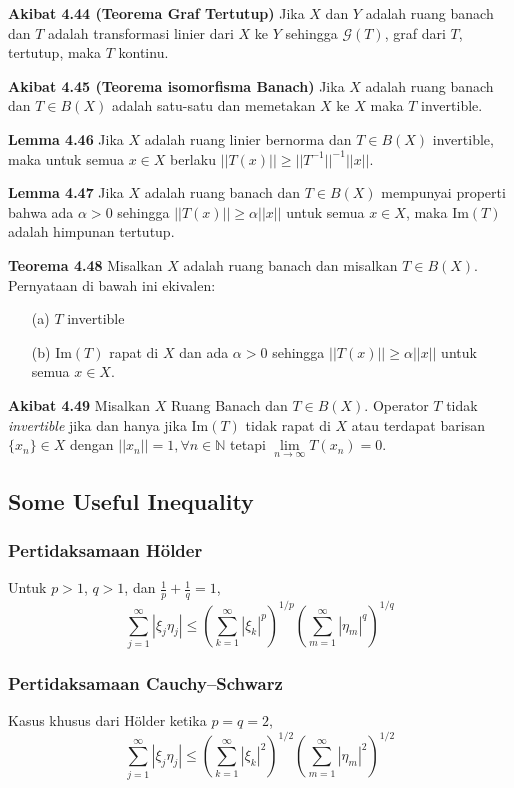 \documentclass{article}
\newcommand{\N}{\mathbb{N}}
\begin{document}
\begin{multicols}{2}
  \textbf{Akibat 4.44 (Teorema Graf Tertutup)}  Jika $X$ dan $Y$ adalah ruang banach dan $T$ adalah transformasi linier dari $X$  ke $Y$ sehingga $\mathcal{G}(T)$, graf dari $T$, tertutup, maka $T$ kontinu.

  \textbf{Akibat 4.45 (Teorema isomorfisma Banach)} Jika $X$ adalah ruang banach dan $T \in B(X)$ adalah satu-satu dan memetakan $X$ ke $X$ maka $T$ invertible.

  \textbf{Lemma 4.46} Jika $X$ adalah ruang linier bernorma dan $T \in B(X)$ invertible, maka untuk semua $x \in X$ berlaku $||T(x)|| \geq ||T^{-1}||^{-1}||x||.$

  \textbf{Lemma 4.47} Jika $X$ adalah ruang banach dan $T \in B(X)$ mempunyai properti bahwa ada $\alpha>0$ sehingga $||T(x)|| \geq \alpha||x||$ untuk semua $x \in X$, maka Im$(T)$ adalah himpunan tertutup.

  \textbf{Teorema 4.48} Misalkan $X$ adalah ruang banach dan misalkan $T \in {B}(X)$. Pernyataan di bawah ini ekivalen:
  \begin{itemize}
    \item [(a)] $T$ invertible
    \item [(b)] Im$(T)$ rapat di $X$ dan ada $\alpha >0$ sehingga $||T(x)|| \geq \alpha||x||$ untuk semua $x \in X$.
  \end{itemize}

  \textbf{Akibat 4.49} Misalkan $X$ Ruang Banach dan $T\in B(X)$. Operator $T$ tidak \textit{invertible} jika dan hanya jika Im$(T)$ tidak rapat di $X$ atau terdapat barisan $\{x_n\}\in X$ dengan $||x_n||=1,\forall n\in \N$ tetapi $\lim\limits_{n\to\infty}T(x_n)=0$.

  \subsection*{Some Useful Inequality}
  \subsubsection*{Pertidaksamaan Hölder}
  Untuk \( p > 1 \), \( q > 1 \), dan \( \frac{1}{p} + \frac{1}{q} = 1 \),
  \[
    \sum_{j=1}^{\infty} |\xi_j \eta_j| \le \left( \sum_{k=1}^{\infty} |\xi_k|^p \right)^{1/p} \left( \sum_{m=1}^{\infty} |\eta_m|^q \right)^{1/q}
  \]
  \subsubsection*{Pertidaksamaan Cauchy–Schwarz}
  Kasus khusus dari Hölder ketika \( p = q = 2 \),
  \[
    \sum_{j=1}^{\infty} |\xi_j \eta_j| \le \left( \sum_{k=1}^{\infty} |\xi_k|^2 \right)^{1/2} \left( \sum_{m=1}^{\infty} |\eta_m|^2 \right)^{1/2}
  \]

\end{multicols}
\end{document}
